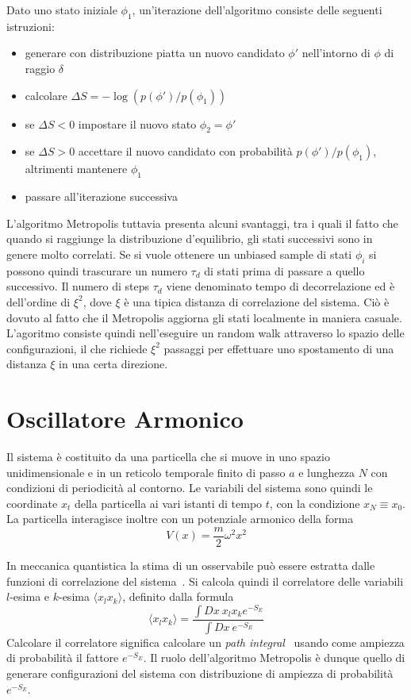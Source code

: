 Dato uno stato iniziale $\phi_1$, un'iterazione dell'algoritmo consiste delle seguenti istruzioni:
\begin{itemize}
    \item generare con distribuzione piatta un nuovo candidato $\phi'$ nell'intorno di $\phi$ di raggio $\delta$
    \item calcolare $\Delta S = -\log(p(\phi')/p(\phi_1))$
    \item se $\Delta S < 0$ impostare il nuovo stato $\phi_2=\phi'$
    \item se $\Delta S > 0$ accettare il nuovo candidato con probabilità $p(\phi')/p(\phi_1)$, altrimenti mantenere $\phi_1$
    \item passare all'iterazione successiva
\end{itemize}
L'algoritmo Metropolis tuttavia presenta alcuni svantaggi, tra i quali il fatto che quando si raggiunge la distribuzione d'equilibrio, gli stati successivi sono in genere molto correlati. Se si vuole ottenere un unbiased sample di stati $\phi_i$ si possono quindi trascurare un numero $\tau_d$ di stati prima di passare a quello successivo. Il numero di steps $\tau_d$ viene denominato tempo di decorrelazione ed è dell'ordine di $\xi^2$, dove $\xi$ è una tipica distanza di correlazione del sistema. Ciò è dovuto al fatto che il Metropolis aggiorna gli stati localmente in maniera casuale. L'agoritmo consiste quindi nell'eseguire un random walk attraverso lo spazio delle configurazioni, il che richiede $\xi^2$ passaggi per effettuare uno spostamento di una distanza $\xi$ in una certa direzione.

\section{Oscillatore Armonico}
Il sistema è costituito da una particella che si muove in uno spazio unidimensionale e in un reticolo temporale finito di passo $a$ e lunghezza $N$ con condizioni di periodicità al contorno. Le variabili del sistema sono quindi le coordinate $x_t$ della particella ai vari istanti di tempo $t$, con la condizione $x_N \equiv x_0$. La particella interagisce inoltre con un potenziale armonico della forma $$V(x) = \frac{m}{2}\omega^2 x^2$$

In meccanica quantistica la stima di un osservabile può essere estratta dalle funzioni di correlazione del sistema~\cite{otto}.
Si calcola quindi il correlatore delle variabili $l$-esima e $k$-esima $\langle x_lx_k\rangle$, definito dalla formula
$$\langle x_lx_k\rangle=\frac{\int Dx\ x_lx_ke^{-S_E}}{\int Dx\ e^{-S_E}}$$
Calcolare il correlatore significa calcolare un \textit{path integral}~\cite{sette} usando come ampiezza di probabilità il fattore $e^{-S_E}$. Il ruolo dell'algoritmo Metropolis è dunque quello di generare configurazioni del sistema con distribuzione di ampiezza di probabilità $e^{-S_E}$.
\\

